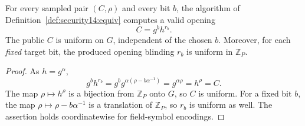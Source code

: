 \begin{theorem}\label{thm:security14:equiv-perfect}
For every sampled pair $(C,\rho)$
and every bit $b$, the algorithm
of Definition~\ref{def:security14:equiv}
computes a valid opening
\[
 \boxed{C=g^b h^{r_b}.}
\]
The public $C$ is uniform on
$G$, independent of the
chosen $b$. Moreover, for
each \emph{fixed} target bit,
the produced opening blinding
$r_b$ is uniform in
$\mathbb Z_P$.
\end{theorem}
\begin{proof}
As $h=g^\alpha$,
\[
 g^b h^{r_b}
 =g^b g^{\alpha(\rho-b\alpha^{-1})}
 =g^{\alpha\rho}=h^\rho=C.
\]
The map $\rho\mapsto h^\rho$
is a bijection from
$\mathbb Z_P$ onto $G$,
so $C$ is uniform.
For a fixed bit $b$,
the map
$\rho\mapsto\rho-b\alpha^{-1}$
is a translation of
$\mathbb Z_P$, so
$r_b$ is uniform as well.
The assertion holds
coordinatewise for
field-symbol encodings.
\end{proof}

